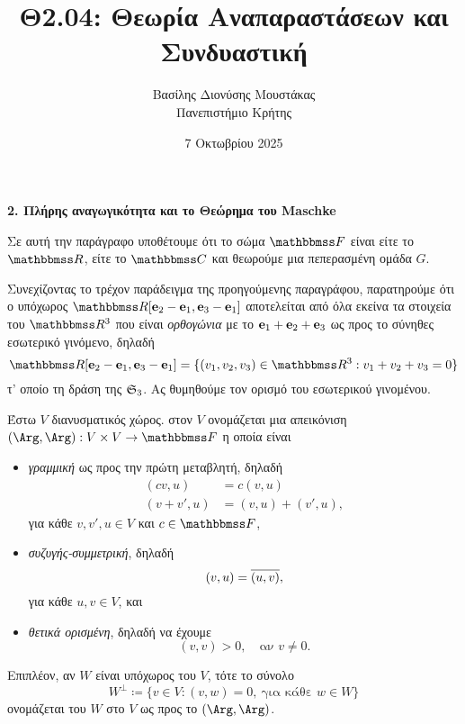 \documentclass[12pt,a4paper,reqno]{amsart}
\title{Θ2.04: Θεωρία Αναπαραστάσεων και Συνδυαστική}
\author[Β.~Δ. Μουστακας]{Βασίλης Διονύσης Μουστάκας \\ Πανεπιστήμιο Κρήτης}
\date{7 Οκτωβρίου 2025}
\newcommand{\defn}[1]{{\color{mylightblue}{#1}}}
\begin{document}
\begingroup
\def\uppercasenonmath#1{} %
\let\MakeUppercase\relax %
\maketitle
\endgroup

\setcounter{section}{2}
\thispagestyle{empty}

\begin{center}
    \textbf{2. Πλήρης αναγωγικότητα και το Θεώρημα του Maschke
}
\end{center}

Σε αυτή την παράγραφο υποθέτουμε ότι το σώμα $\FF$ είναι είτε το $\RR$, είτε το $\CC$ και θεωρούμε μια πεπερασμένη ομάδα $G$.

Συνεχίζοντας το τρέχον παράδειγμα της προηγούμενης παραγράφου, παρατηρούμε ότι ο υπόχωρος $\RR[\bfe_2-\bfe_1,\bfe_3-\bfe_1]$ αποτελείται από όλα εκείνα τα στοιχεία του $\RR^3$ που είναι \emph{ορθογώνια} με το $\mathbf{e}_1 + \mathbf{e}_2 + \mathbf{e}_3$ ως προς το σύνηθες εσωτερικό γινόμενο, δηλαδή
\[
\RR[\bfe_2-\bfe_1,\bfe_3-\bfe_1] =
\{(v_1, v_2, v_3) \in \RR^3 : v_1 + v_2 + v_3 = 0\}
\] 
τ' οποίο  τη δράση της $\mathfrak{S}_3$. Ας θυμηθούμε τον ορισμό του εσωτερικού γινομένου.

\begin{definition}
    \label{def:inner_product}
    Έστω $V$ διανυσματικός χώρος. \defn{Εσωτερικό γινόμενο} στον $V$ ονομάζεται μια απεικόνιση $(\Arg,\Arg) : V\times V \to \FF$ η οποία είναι
    \begin{itemize}
        \item \emph{γραμμική} ως προς την πρώτη μεταβλητή, δηλαδή
        \begin{align*}
            (cv, u)   &= c(v,u) \\
            (v+v', u) &= (v,u) + (v',u),
        \end{align*}
        για κάθε $v, v', u \in V$ και $c \in \FF$,
        \item \emph{συζυγής-συμμετρική}, δηλαδή 
        \[
        (v,u) = \overline{(u,v)},
        \]
        για κάθε $u, v \in V$, και 
        \item \emph{θετικά ορισμένη}, δηλαδή να έχουμε 
        \[
        (v,v) > 0, \quad \text{αν $v \neq 0$}.
        \]
    \end{itemize}
    Επιπλέον, αν $W$ είναι υπόχωρος του $V$, τότε το σύνολο 
    \[
    W^\perp \coloneqq \{v \in V : (v,w) = 0, \ \text{για κάθε $w \in W$}\}
    \]
    ονομάζεται \defn{ορθογώνιο συμπλήρωμα} του $W$ στο $V$ ως προς το $(\Arg, \Arg)$.
\end{definition}
\end{document}
